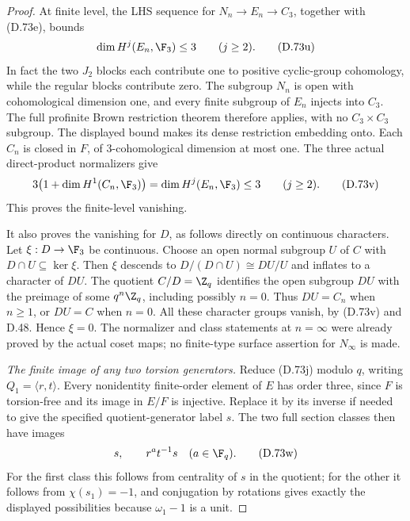 \begin{proof}
At finite level, the LHS sequence for
\(N_n\to E_n\to C_3\), together with (D.73e), bounds
\[
                    \dim H^j(E_n,\F_3)\leq3\qquad(j\geq2).
                                                               \tag{D.73u}
\]
In fact the two \(J_2\) blocks each contribute one
to positive cyclic-group cohomology, while the
regular blocks contribute zero.
The subgroup \(N_n\) is open with cohomological
dimension one, and every finite subgroup of \(E_n\)
injects into \(C_3\). The full profinite Brown
restriction theorem \cite[Theorem~2 and \S1.1]{A-KochloukovaZalesskii2007}
therefore applies, with no
\(C_3\times C_3\) subgroup. The displayed bound
makes its dense restriction embedding onto.
Each \(C_n\) is closed in \(F\), of
\(3\)-cohomological dimension at most one.
The three actual direct-product normalizers give
\[
        3\bigl(1+\dim H^1(C_n,\F_3)\bigr)
                            =\dim H^j(E_n,\F_3)\leq3
                                  \qquad(j\geq2).
                                                               \tag{D.73v}
\]
This proves the finite-level vanishing.

It also proves the vanishing for \(D\), as follows
directly on continuous characters.
Let \(\xi:D\to\F_3\) be continuous.
Choose an open normal subgroup \(U\) of \(C\) with
\(D\cap U\subseteq\ker\xi\).
Then \(\xi\) descends to \(D/(D\cap U)\cong DU/U\)
and inflates to a character of \(DU\).
The quotient \(C/D=\Z_q\) identifies the open
subgroup \(DU\) with the preimage of some
\(q^n\Z_q\), including possibly \(n=0\).
Thus \(DU=C_n\) when \(n\geq1\), or \(DU=C\)
when \(n=0\). All these character groups vanish,
by (D.73v) and D.48. Hence \(\xi=0\).
The normalizer and class statements at \(n=\infty\)
were already proved by the actual coset maps;
no finite-type surface assertion for \(N_\infty\)
is made.

\emph{The finite image of any two torsion generators.}
Reduce (D.73j) modulo \(q\), writing
\(Q_1=\langle r,t\rangle\).
Every nonidentity finite-order element of \(E\)
has order three, since \(F\) is torsion-free and
its image in \(E/F\) is injective.
Replace it by its inverse if needed to give the
specified quotient-generator label \(s\).
The two full section classes then have images
\[
                  s,\qquad r^a t^{-1}s\quad(a\in\F_q).
                                                               \tag{D.73w}
\]
For the first class this follows from centrality
of \(s\) in the quotient; for the other it follows
from \(\chi(s_1)=-1\), and conjugation by rotations
gives exactly the displayed possibilities because
\(\omega_1-1\) is a unit.


\end{proof}
